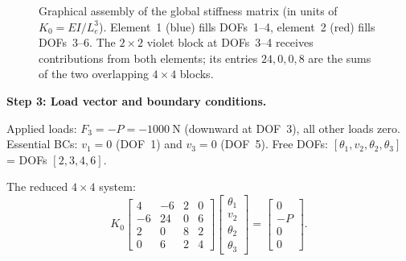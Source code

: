 \begin{example}
\begin{figure}[htbp]
\caption{Graphical assembly of the global stiffness matrix
(in units of $K_0 = EI/L_e^3$). Element~1 (blue) fills DOFs~1--4,
element~2 (red) fills DOFs~3--6. The $2{\times}2$ violet block at
DOFs~3--4 receives contributions from both elements; its entries
$24, 0, 0, 8$ are the sums of the two overlapping $4\times 4$ blocks.}
\label{fig:beam_simple_K_assembly}
\end{figure}

\medskip
\noindent\textbf{Step 3: Load vector and boundary conditions.}

Applied loads: $F_3 = -P = -1000\ \text{N}$ (downward at DOF~3), all
other loads zero.
Essential BCs: $v_1 = 0$ (DOF~1) and $v_3 = 0$ (DOF~5). Free DOFs:
$[\theta_1, v_2, \theta_2, \theta_3]$ = DOFs $[2, 3, 4, 6]$.

The reduced $4\times4$ system:
\begin{equation}
    K_0
    \begin{bmatrix} 4 & -6 &  2 &  0 \\
                   -6 & 24 &  0 &  6 \\
                    2 &  0 &  8 &  2 \\
                    0 &  6 &  2 &  4 \end{bmatrix}
    \begin{bmatrix} \theta_1 \\ v_2 \\ \theta_2 \\ \theta_3 \end{bmatrix}
    =
    \begin{bmatrix} 0 \\ -P \\ 0 \\ 0 \end{bmatrix} .
    \label{eq:beam2_reduced}
\end{equation}


\end{example}
